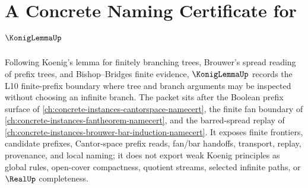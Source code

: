 \chapter{A Concrete Naming Certificate for $\KonigLemmaUp$}
\label{ch:concrete-instances-konig-lemma-namecert}

Following Koenig's lemma for finitely branching trees, Brouwer's spread reading of prefix trees, and Bishop--Bridges finite evidence, $\KonigLemmaUp$ records the L10 finite-prefix boundary where tree and branch arguments may be inspected without choosing an infinite branch. The packet sits after the Boolean prefix surface of \autoref{ch:concrete-instances-cantorspace-namecert}, the finite fan boundary of \autoref{ch:concrete-instances-fantheorem-namecert}, and the barred-spread replay of \autoref{ch:concrete-instances-brouwer-bar-induction-namecert}. It exposes finite frontiers, candidate prefixes, Cantor-space prefix reads, fan/bar handoffs, transport, replay, provenance, and local naming; it does not export weak Koenig principles as global rules, open-cover compactness, quotient streams, selected infinite paths, or $\RealUp$ completeness.

